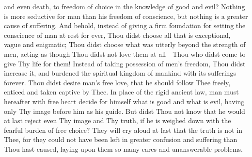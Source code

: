 and even death, to freedom of choice in the knowledge of good and
evil? Nothing is more seductive for man than his freedom of
conscience, but nothing is a greater cause of suffering. And behold,
instead of giving a firm foundation for setting the conscience of man
at rest for ever, Thou didst choose all that is exceptional, vague and
enigmatic; Thou didst choose what was utterly beyond the strength of
men, acting as though Thou didst not love them at all---Thou who didst
come to give Thy life for them! Instead of taking possession of men's
freedom, Thou didst increase it, and burdened the spiritual kingdom of
mankind with its sufferings forever. Thou didst desire man's free
love, that he should follow Thee freely, enticed and taken captive by
Thee. In place of the rigid ancient law, man must hereafter with free
heart decide for himself what is good and what  is evil,
having only Thy image before him as his guide. But didst Thou not know
that he would at last reject even Thy image and Thy truth, if he is
weighed down with the fearful burden of free choice? They will cry
aloud at last that the truth is not in Thee, for they could not have
been left in greater confusion and suffering than Thou hast caused,
laying upon them so many cares and unanswerable problems.

